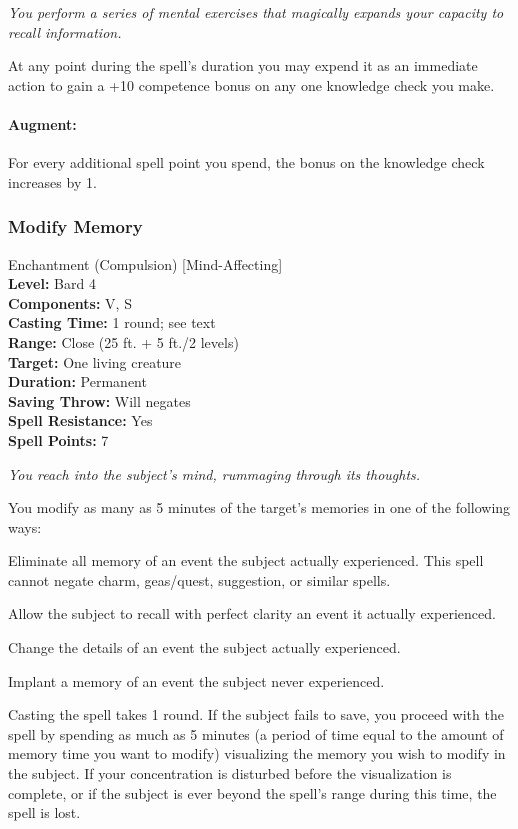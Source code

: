 \emph{You perform a series of mental exercises that magically expands your capacity to recall information.}

At any point during the spell's duration you may expend it as an immediate action to gain a +10 competence bonus on any one knowledge check you make.

\paragraph{Augment:} For every additional spell point you spend, the bonus on the knowledge check increases by 1.

\subsubsection{Modify Memory}
\label{Spell:ModifyMemory}
Enchantment (Compulsion) [Mind-Affecting]
\\ \textbf{Level:} Bard 4
\\ \textbf{Components:} V, S
\\ \textbf{Casting Time:} 1 round; see text
\\ \textbf{Range:} Close (25 ft. + 5 ft./2 levels)
\\ \textbf{Target:} One living creature
\\ \textbf{Duration:} Permanent
\\ \textbf{Saving Throw:} Will negates
\\ \textbf{Spell Resistance:} Yes
\\ \textbf{Spell Points:} 7

\emph{You reach into the subject's mind, rummaging through its thoughts.}

You modify as many as 5 minutes of the target's memories in one of the following ways:

\begin{list}{}{\leftmargin=1em}
 \item Eliminate all memory of an event the subject actually experienced. This spell cannot negate charm, geas/quest, suggestion, or similar spells.
 \item Allow the subject to recall with perfect clarity an event it actually experienced.
 \item Change the details of an event the subject actually experienced.
 \item Implant a memory of an event the subject never experienced.
\end{list}
Casting the spell takes 1 round. If the subject fails to save, you proceed with the spell by spending as much as 5 minutes (a period of time equal to the amount of memory time you want to modify) visualizing the memory you wish to modify in the subject. If your concentration is disturbed before the visualization is complete, or if the subject is ever beyond the spell's range during this time, the spell is lost.

